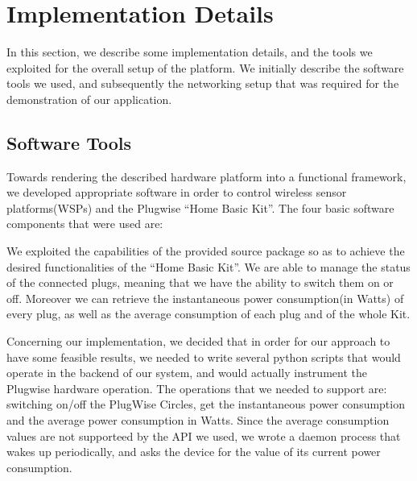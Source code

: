 \documentclass[conference]{IEEEtran}
\begin{document}
\section{Implementation Details}
In this section, we describe some implementation details, and the tools we exploited for the overall setup of the platform. We initially describe the software tools we used, and subsequently the networking setup that was required for the demonstration of our application.

\subsection{Software Tools}
Towards rendering the described hardware platform into a functional framework, we developed appropriate software in order to control wireless sensor platforms(WSPs) and the Plugwise “Home Basic Kit”. 
The four basic software components that were used are:






We exploited the capabilities of the provided source package \cite{plugwise}  so as to achieve the desired functionalities of the “Home Basic Kit”.
We are able to manage the status of the connected plugs, meaning that we have the ability  to switch them on or off. 
Moreover we can retrieve the instantaneous power consumption(in Watts) of every plug, as well as the average consumption of each plug and of the whole Kit. 

Concerning our implementation, we decided that in order for our approach to have some feasible results, we needed to write several python scripts that would operate in the backend of our system, and would actually instrument the Plugwise hardware operation. 
The operations that we needed to support are: switching on/off the PlugWise Circles, get the instantaneous power consumption and the average power consumption in Watts. 
Since the average consumption values are not supporteed by the API we used, we wrote a daemon process that wakes up periodically, and asks the device for the value of its current power consumption. 
\end{document}
